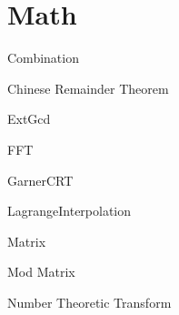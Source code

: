 \section{Math}

Combination


Chinese Remainder Theorem


ExtGcd


FFT


GarnerCRT


LagrangeInterpolation


Matrix


Mod Matrix


Number Theoretic Transform

